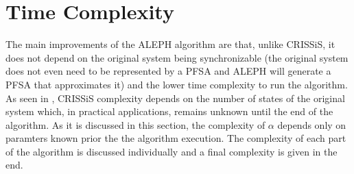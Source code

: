 {%
%
%
%
\section{Time Complexity}

The main improvements of the ALEPH algorithm are that, unlike CRISSiS, it does not depend on the original system being synchronizable (the original system does not even need to be represented by a PFSA and ALEPH will generate a PFSA that approximates it) and the lower time complexity to run the algorithm. As seen in \citep{asok.11}, CRISSiS complexity depends on the number of states of the original system which, in practical applications, remains unknown until the end of the algorithm. As it is discussed in this section, the complexity of $\alpha$ depends only on paramters known prior the the algorithm execution. The complexity of each part of the algorithm is discussed individually and a final complexity is given in the end.

}
